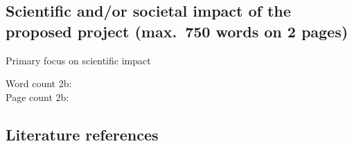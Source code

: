 
\newpage
\subsection{Scientific and/or societal impact of the proposed project (max.~750 words on 2 pages)}\label{sec:KU}
\setcounter{imppage}{-\value{page}}

Primary focus on scientific impact

\countem



\endcountem
\addtocounter{imppage}{\value{page}}

\vspace{2em}
Word count 2b:     \thewordcount{}\\
Page count 2b:     \\


\newpage
\subsection{Literature references}\label{sec:ref}

\newrefcontext[sorting=nyt]
\printbibliography[heading=none,notcategory=fullcited]


